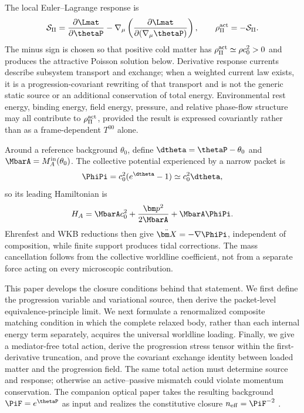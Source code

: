\documentclass[12pt]{article}
\begin{document}
The local Euler--Lagrange response is
\begin{equation}
    \mathcal S_\Pi
    =
    \frac{\partial\Lmat}{\partial\thetaP}
    -\nabla_\mu\left(
    \frac{\partial\Lmat}{\partial(\nabla_\mu\thetaP)}
    \right),
    \qquad
    \rho_\Pi^{\rm act}=-\mathcal S_\Pi .
    \label{eq:intro-active-source}
\end{equation}
The minus sign is chosen so that positive cold matter has \(\rho_\Pi^{\rm act}\simeq\rho c_0^2>0\) and produces the attractive Poisson solution below.  Derivative response currents describe subsystem transport and exchange; when a weighted current law exists, it is a progression-covariant rewriting of that transport and is not the generic static source or an additional conservation of total energy.  Environmental rest energy, binding energy, field energy, pressure, and relative phase-flow structure may all contribute to \(\rho_\Pi^{\rm act}\), provided the result is expressed covariantly rather than as a frame-dependent \(T^{00}\) alone.

Around a reference background \(\theta_0\), define \(\dtheta=\thetaP-\theta_0\) and \(\MbarA=M_A^{\rm in}(\theta_0)\).  The collective potential experienced by a narrow packet is
\begin{equation}
    \PhiPi=c_0^2(e^{\dtheta}-1)\simeq c_0^2\dtheta,
\end{equation}
so its leading Hamiltonian is
\begin{equation}
    H_A=\MbarA c_0^2+\frac{\bm p^2}{2\MbarA}+\MbarA\PhiPi .
\end{equation}
Ehrenfest and WKB reductions then give \(\ddot{\bm X}=-\nabla\PhiPi\), independent of composition, while finite support produces tidal corrections.  The mass cancellation follows from the collective worldline coefficient, not from a separate force acting on every microscopic contribution.

This paper develops the closure conditions behind that statement.  We first define the progression variable and variational source, then derive the packet-level equivalence-principle limit.  We next formulate a renormalized composite matching condition in which the complete relaxed body, rather than each internal energy term separately, acquires the universal worldline loading.  Finally, we give a mediator-free total action, derive the progression stress tensor within the first-derivative truncation, and prove the covariant exchange identity between loaded matter and the progression field.  The same total action must determine source and response; otherwise an active--passive mismatch could violate momentum conservation.  The companion optical paper takes the resulting background \(\PiF=e^{\thetaP}\) as input and realizes the constitutive closure \(n_{\rm eff}=\PiF^{-2}\) \cite{JordanOpticsCompanion}.
\end{document}
